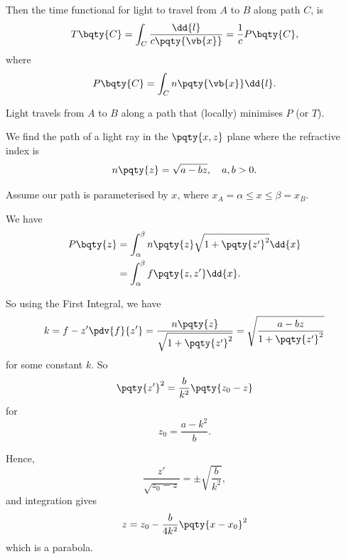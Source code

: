 Then the time functional for light to travel from \(A\) to \(B\) along path \(C\), is
\[
    T\bqty{C} = \int_{C} \frac{\dd{l}}{c\pqty{\vb{x}}} = \frac{1}{c} P\bqty{C},
\]
where
\[
    P\bqty{C} = \int_{C} n\pqty{\vb{x}} \dd{l}.
\]

\begin{theorem}
    Light travels from \(A\) to \(B\) along a path that (locally) minimises \(P\) (or \(T\)).
\end{theorem}

\begin{example}
    We find the path of a light ray in the \(\pqty{x, z}\) plane where the refractive index is
    \[
        n\pqty{z} = \sqrt{a - bz}, \quad a, b > 0.
    \]

    Assume our path is parameterised by \(x\), where \(x_A = \alpha \leq x \leq \beta = x_B\).

    We have
    \begin{align*}
        P\bqty{z} &= \int_{\alpha}^{\beta} n\pqty{z} \sqrt{1 + \pqty{z'}^2} \dd{x} \\
        &= \int_{\alpha}^{\beta} f\pqty{z, z'} \dd{x}.
    \end{align*}

    So using the First Integral, we have
    \[
        k = f - z' \pdv{f}{z'} = \frac{n\pqty{z}}{\sqrt{1 + \pqty{z'}^2}} = \sqrt{\frac{a - bz}{1 + \pqty{z'}^2}}
    \]
    for some constant \(k\). So
    \[
        \pqty{z'}^2 = \frac{b}{k^2} \pqty{z_0 - z}
    \]
    for
    \[
        z_0 = \frac{a - k^2}{b}.
    \]

    Hence,
    \[
        \frac{z'}{\sqrt{z_0 - z}} = \pm \sqrt{\frac{b}{k^2}},
    \]
    and integration gives
    \[
        z = z_0 - \frac{b}{4k^2} \pqty{x - x_0}^2
    \]
    which is a parabola.
\end{example}

